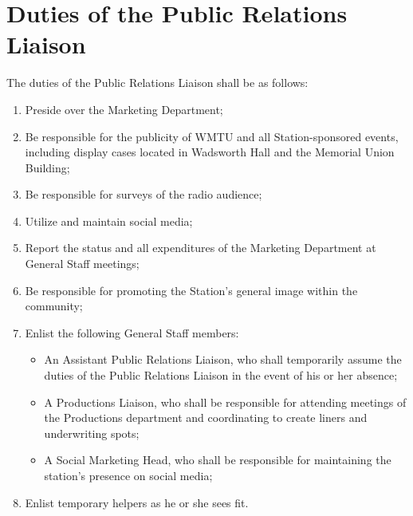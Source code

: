 \documentclass[12pt]{constitution}
\begin{document}
\section{​Duties of the Public Relations Liaison}
The duties of the Public Relations Liaison shall be as follows:
\begin{enumerate}
\item Preside over the Marketing Department;
\item Be responsible for the publicity of WMTU and all Station-sponsored events, including display cases located in Wadsworth Hall and the Memorial Union Building;
\item Be responsible for surveys of the radio audience;
\item Utilize and maintain social media;
\item Report the status and all expenditures of the Marketing Department at General Staff meetings;
\item Be responsible for promoting the Station's general image within the community;
\item Enlist the following General Staff members:
\begin{itemize}
\item An Assistant Public Relations Liaison, who shall temporarily assume the duties of the Public Relations Liaison in the event of his or her absence;
\item A Productions Liaison, who shall be responsible for attending meetings of the Productions department and coordinating to create liners and underwriting spots;
\item A Social Marketing Head, who shall be responsible for maintaining the station's presence on social media;
\end{itemize}
\item Enlist temporary helpers as he or she sees fit.
\end{enumerate}
\end{document}
